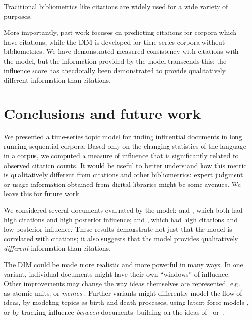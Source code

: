

Traditional bibliometrics like citations are widely used for a wide
variety of purposes. 

More importantly, past work focuses on predicting citations for
corpora which have citations, while the DIM is developed for
time-series corpora without bibliometrics.  We have demonstrated
measured consistency with citations with the model, but the
information provided by the model transcends this: the influence score
has anecdotally been demonstrated to provide qualitatively
different information than citations.

\section{Conclusions and future work}

We presented a time-series topic model for finding influential
documents in long running sequential corpora.  Based only on the
changing statistics of the language in a corpus, we computed a measure
of influence that is significantly related to observed citation
counts. It would be useful to better understand how this metric is
qualitatively different from citations and other bibliometrics: expert
judgment or usage information obtained from digital libraries might be
some avenues.  We leave this for future work.

We considered several documents evaluated by the model:
\cite{brown:1993} and \cite{toole:1984}, which both had high citations
and high posterior influence; and \cite{marcus:1993}, which had high
citations and low posterior influence.
These results demonstrate not just that the model is correlated with
citations; it also suggests that the model provides qualitatively
\emph{different} information than citations.

The DIM could be made more realistic and more powerful in many
ways.  In one variant, individual documents might have their own
``windows'' of influence.  Other improvements may change the way ideas
themselves are represented, e.g. as atomic units, or \emph{memes}
\cite{leskovec:2009}.  Further variants might differently model the
flow of ideas, by modeling topics as birth and death processes, using
latent force models \cite{alvarez:2009}, or by tracking influence
\emph{between} documents, building on the ideas
of~\cite{shaparenko:2007} or~\cite{dietz:2007}. %

